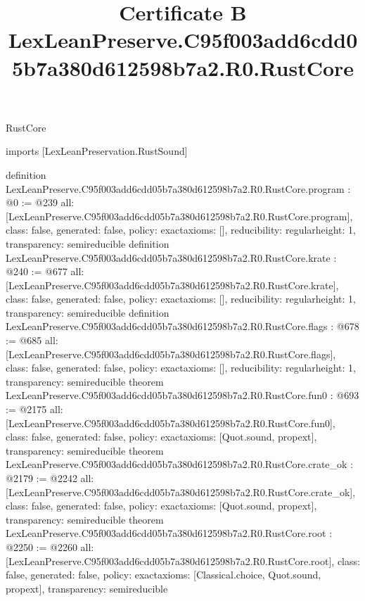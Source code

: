 \begin{lexlean}{RustCore}
\title{Certificate B LexLeanPreserve.C95f003add6cdd05b7a380d612598b7a2.R0.RustCore}
\begin{coremodule}
imports [LexLeanPreservation.RustSound]

definition LexLeanPreserve.C95f003add6cdd05b7a380d612598b7a2.R0.RustCore.program : @0 := @239 {
  all: [LexLeanPreserve.C95f003add6cdd05b7a380d612598b7a2.R0.RustCore.program],
  class: false,
  generated: false,
  policy: exact{axioms: []},
  reducibility: regular{height: 1},
  transparency: semireducible
}
definition LexLeanPreserve.C95f003add6cdd05b7a380d612598b7a2.R0.RustCore.krate : @240 := @677 {
  all: [LexLeanPreserve.C95f003add6cdd05b7a380d612598b7a2.R0.RustCore.krate],
  class: false,
  generated: false,
  policy: exact{axioms: []},
  reducibility: regular{height: 1},
  transparency: semireducible
}
definition LexLeanPreserve.C95f003add6cdd05b7a380d612598b7a2.R0.RustCore.flags : @678 := @685 {
  all: [LexLeanPreserve.C95f003add6cdd05b7a380d612598b7a2.R0.RustCore.flags],
  class: false,
  generated: false,
  policy: exact{axioms: []},
  reducibility: regular{height: 1},
  transparency: semireducible
}
theorem LexLeanPreserve.C95f003add6cdd05b7a380d612598b7a2.R0.RustCore.fun0 : @693 := @2175 {
  all: [LexLeanPreserve.C95f003add6cdd05b7a380d612598b7a2.R0.RustCore.fun0],
  class: false,
  generated: false,
  policy: exact{axioms: [Quot.sound, propext]},
  transparency: semireducible
}
theorem LexLeanPreserve.C95f003add6cdd05b7a380d612598b7a2.R0.RustCore.crate_ok : @2179 := @2242 {
  all: [LexLeanPreserve.C95f003add6cdd05b7a380d612598b7a2.R0.RustCore.crate_ok],
  class: false,
  generated: false,
  policy: exact{axioms: [Quot.sound, propext]},
  transparency: semireducible
}
theorem LexLeanPreserve.C95f003add6cdd05b7a380d612598b7a2.R0.RustCore.root : @2250 := @2260 {
  all: [LexLeanPreserve.C95f003add6cdd05b7a380d612598b7a2.R0.RustCore.root],
  class: false,
  generated: false,
  policy: exact{axioms: [Classical.choice, Quot.sound, propext]},
  transparency: semireducible
}


\end{coremodule}
\end{lexlean}

